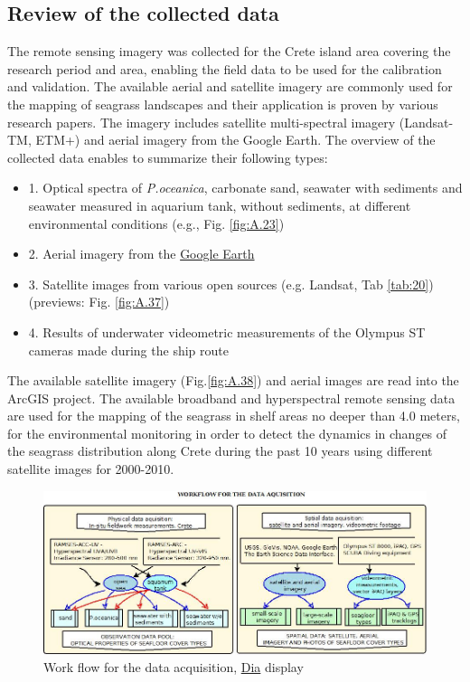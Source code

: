 \documentclass[11pt]{article}
\begin{document}
\subsection{Review of the collected data}
The remote sensing imagery was collected for the Crete island area covering the research period and
area, enabling the field data to be used for the calibration and validation. The available aerial and
satellite imagery are commonly used for the mapping of seagrass landscapes and their application is
proven by various research papers. The imagery includes satellite multi-spectral imagery (Landsat-TM,
ETM+) and aerial imagery from the Google Earth.
The overview of the collected data enables to summarize their following types:
\begin{itemize}
	\item[] 1. Optical spectra of \textit{P.oceanica}, carbonate sand, seawater with sediments and seawater measured in aquarium tank, without sediments, at different environmental conditions (e.g., Fig. \ref{fig:A.23})
	\item[]2. Aerial imagery from the \href{http://www.google.com/earth/index.html}{Google Earth}
	\item[]3. Satellite images from various open sources (e.g. Landsat, Tab \ref{tab:20}) (previews: Fig. \ref{fig:A.37})
	\item[]4. Results of underwater videometric measurements of the \ac{Olympus ST} cameras made during the ship route
\end{itemize}
The available satellite imagery (Fig.\ref{fig:A.38}) \label{page-30}and aerial images are read into the ArcGIS project.
The available broadband and hyperspectral remote sensing data are used for the mapping of the
seagrass in shelf areas no deeper than 4.0 meters, for the environmental monitoring in order to detect
the dynamics in changes of the seagrass distribution along Crete during the past 10 years using
different satellite images for 2000-2010.

\begin{figure}[h]
	\centering
	\includegraphics[scale=0.40]{UML_Dia.jpg}
	\caption{Work flow for the data acquisition, \href{http://live.gnome.org/Dia}{Dia} display}
	\label{fig:24}
\end{figure}
\end{document}
